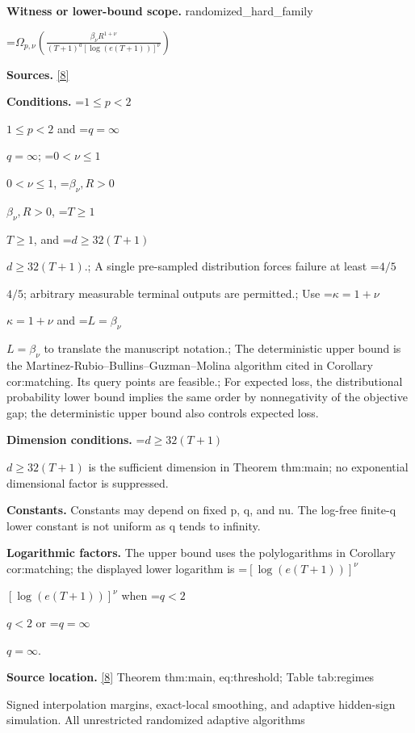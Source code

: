 \documentclass[10pt,a4paper]{article}
\newcommand{\AtlasMath}[1]{\par\begingroup\centering\setbox0=\hbox{$\displaystyle #1$}\ifdim\wd0>1.4\linewidth\typeout{ATLAS WIDE FORMULA: \the\wd0}\fi\ifdim\wd0>\linewidth\resizebox{\linewidth}{!}{\box0}\else\box0\fi\par\endgroup}
\newcommand{\AtlasInlineMath}[1]{\begingroup\setbox0=\hbox{$#1$}\ifdim\wd0>.4\linewidth\endgroup\AtlasMath{#1}\else\endgroup$#1$\fi}
\begin{document}
\textbf{Witness or lower-bound scope.} randomized\_hard\_family



\AtlasMath{\Omega_{p,\nu}\!\left(\frac{\beta_\nu R^{1+\nu}}{(T+1)^a[\log(e(T+1))]^\nu}\right)}


\textbf{Sources.} \href{https://github.com/WU-Wendao/Colombo/blob/main/colombo_sensorium/Complexity_altas/data/sources/colombo/B1/manuscript.pdf}{[8]}



\textbf{Conditions.} \AtlasInlineMath{1\le p<2} and \AtlasInlineMath{q=\infty}; \AtlasInlineMath{0<\nu\le1}, \AtlasInlineMath{\beta_\nu,R>0}, \AtlasInlineMath{T\ge1}, and \AtlasInlineMath{d\ge32(T+1)}.; A single pre-sampled distribution forces failure at least \AtlasInlineMath{4/5}; arbitrary measurable terminal outputs are permitted.; Use \AtlasInlineMath{\kappa=1+\nu} and \AtlasInlineMath{L=\beta_\nu} to translate the manuscript notation.; The deterministic upper bound is the Martinez-Rubio--Bullins--Guzman--Molina algorithm cited in Corollary cor:matching. Its query points are feasible.; For expected loss, the distributional probability lower bound implies the same order by nonnegativity of the objective gap; the deterministic upper bound also controls expected loss.



\textbf{Dimension conditions.} \AtlasInlineMath{d\ge32(T+1)} is the sufficient dimension in Theorem thm:main; no exponential dimensional factor is suppressed.



\textbf{Constants.} Constants may depend on fixed p, q, and nu. The log-free finite-q lower constant is not uniform as q tends to infinity.



\textbf{Logarithmic factors.} The upper bound uses the polylogarithms in Corollary cor:matching; the displayed lower logarithm is \AtlasInlineMath{[\log(e(T+1))]^\nu} when \AtlasInlineMath{q<2} or \AtlasInlineMath{q=\infty}.



\textbf{Source location.} \href{https://github.com/WU-Wendao/Colombo/blob/main/colombo_sensorium/Complexity_altas/data/sources/colombo/B1/manuscript.pdf}{[8]} Theorem thm:main, eq:threshold; Table tab:regimes



Signed interpolation margins, exact-local smoothing, and adaptive hidden-sign simulation. All unrestricted randomized adaptive algorithms
\end{document}
